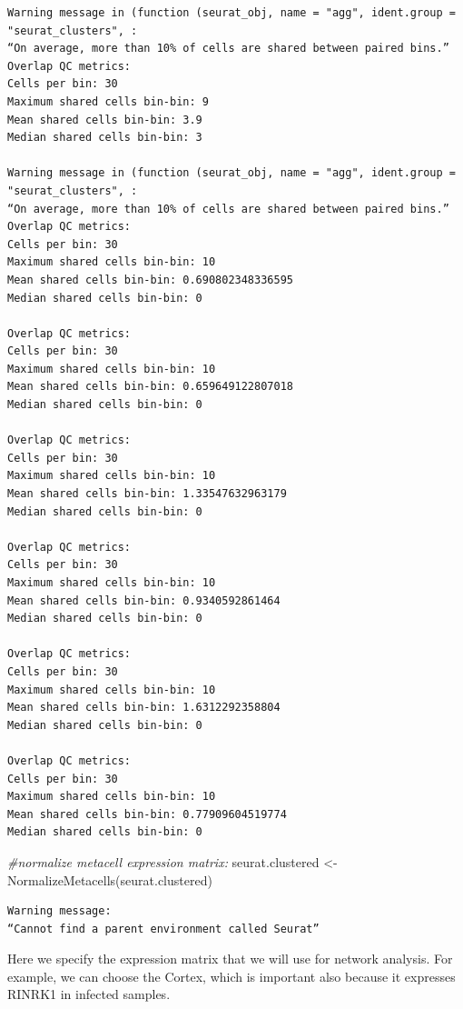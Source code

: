 \documentclass[
  letterpaper,
  DIV=11,
  numbers=noendperiod]{scrartcl}
\newenvironment{Shaded}{}{}
\newcommand{\CommentTok}[1]{\textcolor[rgb]{0.38,0.63,0.69}{\textit{#1}}}
\newcommand{\FunctionTok}[1]{\textcolor[rgb]{0.02,0.16,0.49}{#1}}
\newcommand{\NormalTok}[1]{#1}
\newcommand{\OtherTok}[1]{\textcolor[rgb]{0.00,0.44,0.13}{#1}}
\begin{document}
\begin{verbatim}
Warning message in (function (seurat_obj, name = "agg", ident.group = "seurat_clusters", :
“On average, more than 10% of cells are shared between paired bins.”
Overlap QC metrics:
Cells per bin: 30
Maximum shared cells bin-bin: 9
Mean shared cells bin-bin: 3.9
Median shared cells bin-bin: 3

Warning message in (function (seurat_obj, name = "agg", ident.group = "seurat_clusters", :
“On average, more than 10% of cells are shared between paired bins.”
Overlap QC metrics:
Cells per bin: 30
Maximum shared cells bin-bin: 10
Mean shared cells bin-bin: 0.690802348336595
Median shared cells bin-bin: 0

Overlap QC metrics:
Cells per bin: 30
Maximum shared cells bin-bin: 10
Mean shared cells bin-bin: 0.659649122807018
Median shared cells bin-bin: 0

Overlap QC metrics:
Cells per bin: 30
Maximum shared cells bin-bin: 10
Mean shared cells bin-bin: 1.33547632963179
Median shared cells bin-bin: 0

Overlap QC metrics:
Cells per bin: 30
Maximum shared cells bin-bin: 10
Mean shared cells bin-bin: 0.9340592861464
Median shared cells bin-bin: 0

Overlap QC metrics:
Cells per bin: 30
Maximum shared cells bin-bin: 10
Mean shared cells bin-bin: 1.6312292358804
Median shared cells bin-bin: 0

Overlap QC metrics:
Cells per bin: 30
Maximum shared cells bin-bin: 10
Mean shared cells bin-bin: 0.77909604519774
Median shared cells bin-bin: 0
\end{verbatim}

\begin{Shaded}
\begin{Highlighting}[]
\CommentTok{\#normalize metacell expression matrix:}
\NormalTok{seurat.clustered }\OtherTok{\textless{}{-}} \FunctionTok{NormalizeMetacells}\NormalTok{(seurat.clustered)}
\end{Highlighting}
\end{Shaded}

\begin{verbatim}
Warning message:
“Cannot find a parent environment called Seurat”
\end{verbatim}

Here we specify the expression matrix that we will use for network
analysis. For example, we can choose the Cortex, which is important also
because it expresses RINRK1 in infected samples.
\end{document}
